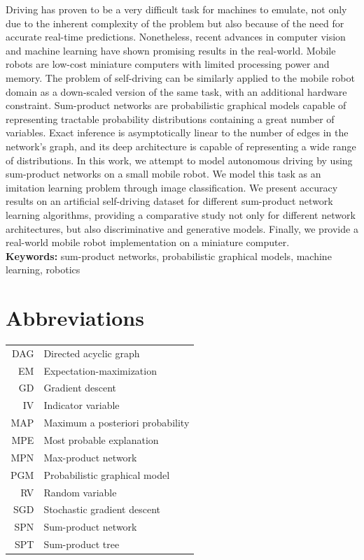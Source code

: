 Driving has proven to be a very difficult task for machines to emulate, not only due to the
inherent complexity of the problem but also because of the need for accurate real-time predictions.
Nonetheless, recent advances in computer vision and machine learning have shown promising results
in the real-world. Mobile robots are low-cost miniature computers with limited processing power and
memory. The problem of self-driving can be similarly applied to the mobile robot domain as a
down-scaled version of the same task, with an additional hardware constraint. Sum-product networks
are probabilistic graphical models capable of representing tractable probability distributions
containing a great number of variables.  Exact inference is asymptotically linear to the number of
edges in the network's graph, and its deep architecture is capable of representing a wide range of
distributions. In this work, we attempt to model autonomous driving by using sum-product networks
on a small mobile robot. We model this task as an imitation learning problem through image
classification. We present accuracy results on an artificial self-driving dataset for different
sum-product network learning algorithms, providing a comparative study not only for different
network architectures, but also discriminative and generative models. Finally, we provide a
real-world mobile robot implementation on a miniature computer.\\

\noindent\textbf{Keywords:} sum-product networks, probabilistic graphical models, machine learning,
robotics

\chapter*{Abbreviations}
\begin{tabular}{rl}
  DAG & Directed acyclic graph\\
  EM & Expectation-maximization\\
  GD & Gradient descent\\
  IV & Indicator variable\\
  MAP & Maximum a posteriori probability\\
  MPE & Most probable explanation\\
  MPN & Max-product network\\
  PGM & Probabilistic graphical model\\
  RV & Random variable\\
  SGD & Stochastic gradient descent\\
  SPN & Sum-product network\\
  SPT & Sum-product tree\\
\end{tabular}

